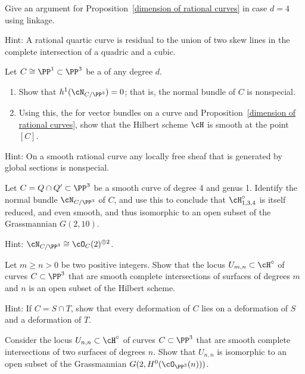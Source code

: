 \begin{exercise}
Give an argument for Proposition~\ref{dimension of rational curves}
in case $d=4$ using linkage.

Hint: A rational quartic curve is residual to the union of two skew
lines in the complete intersection of a quadric and a cubic.
\end{exercise}

\begin{exercise}
Let $C \cong \PP^1 \subset \PP^3$ be a
 of any
%
degree $d$.
\begin{enumerate}
\item Show that $h^1(\cN_{C/\PP^3}) = 0$; that is, the normal bundle of
$C$ is nonspecial.
\item Using this, the
%
for vector bundles on a curve
and Proposition~\ref{dimension of rational curves}, show that the Hilbert
scheme $\cH$ is smooth at the point $[C]$.
\end{enumerate}

Hint: On a smooth rational curve any locally free sheaf that is generated
by global sections is nonspecial.
\end{exercise}

\begin{exercise}\label{hilb 1,3,4}
Let $C = Q \cap Q' \subset \PP^3$ be a smooth curve of degree 4 and genus
1. Identify the normal bundle $\cN_{C/\PP^3}$ of $C$, and use this to
conclude that $\cH^\circ_{1,3,4}$ is itself reduced, and even smooth,
and thus isomorphic to an open subset of the Grassmannian $G(2,10)$.

Hint: $\cN_{C/\PP^3} \cong \cO_C(2)^{\oplus 2}$.
\end{exercise}

\begin{exercise}\label{complete intersection open}
Let $m \geq n >0$ be two positive integers. Show that the locus $U_{m,n}
\subset \cH^\circ$ of curves $C \subset \PP^3$ that are smooth complete
intersections of surfaces of degrees $m$ and $n$ is an open subset of
the Hilbert scheme.

Hint: If $C = S \cap T$, show that every deformation of $C$ lies on a
deformation of $S$ and a deformation of $T$.
\end{exercise}

\begin{exercise}\label{first complete intersection exercise}
Consider  the locus $U_{n,n} \subset \cH^\circ$ of curves $C \subset
\PP^3$ that are smooth complete intersections of two surfaces of degrees
$n$. Show that $U_{n,n}$
is isomorphic to an open subset of the Grassmannian $G(2,
H^0(\cO_{\PP^3}(n)))$.
\end{exercise}

